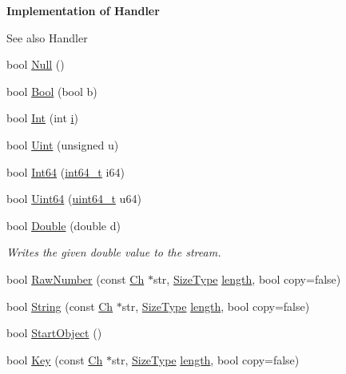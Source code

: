 \begin{Indent}\textbf{ Implementation of Handler}\par
{\em \begin{DoxySeeAlso}{See also}
Handler 
\end{DoxySeeAlso}
}\begin{DoxyCompactItemize}
\item 
bool \hyperlink{classWriter_af700ed03c8810d48a4aaa3c5baeaf26c}{Null} ()
\item 
bool \hyperlink{classWriter_ad7491f4dedb02e7456b240b23ef8c1ad}{Bool} (bool b)
\item 
bool \hyperlink{classWriter_ad471415aa7741e732bab0bcfbb9522a8}{Int} (int \hyperlink{game__play__state_8cpp_acb559820d9ca11295b4500f179ef6392}{i})
\item 
bool \hyperlink{classWriter_a5fb0c3228f89f6f9bef15f3e6e6f1739}{Uint} (unsigned u)
\item 
bool \hyperlink{classWriter_a4144d7086ed9d3d807c373de242bde45}{Int64} (\hyperlink{stdint_8h_a414156feea104f8f75b4ed9e3121b2f6}{int64\+\_\+t} i64)
\item 
bool \hyperlink{classWriter_a55bb9f286ecdaf4cdb07bddb02e0cb2d}{Uint64} (\hyperlink{stdint_8h_aec6fcb673ff035718c238c8c9d544c47}{uint64\+\_\+t} u64)
\item 
bool \hyperlink{classWriter_a22a43e8a7193105deec6b808736f7a1a}{Double} (double d)
\begin{DoxyCompactList}\small\item\em Writes the given {\ttfamily double} value to the stream. \end{DoxyCompactList}\item 
bool \hyperlink{classWriter_ad462dc606fddea0f34fc0e190c3bdaee}{Raw\+Number} (const \hyperlink{classWriter_ab08bff5fd2daec65f4a78779ca3d2139}{Ch} $\ast$str, \hyperlink{rapidjson_8h_a5ed6e6e67250fadbd041127e6386dcb5}{Size\+Type} \hyperlink{imgui__impl__opengl3__loader_8h_a011fc24f10426c01349e94a4edd4b0d5}{length}, bool copy=false)
\item 
bool \hyperlink{classWriter_a8b4dc44f471403a83c9959575796ceab}{String} (const \hyperlink{classWriter_ab08bff5fd2daec65f4a78779ca3d2139}{Ch} $\ast$str, \hyperlink{rapidjson_8h_a5ed6e6e67250fadbd041127e6386dcb5}{Size\+Type} \hyperlink{imgui__impl__opengl3__loader_8h_a011fc24f10426c01349e94a4edd4b0d5}{length}, bool copy=false)
\item 
bool \hyperlink{classWriter_aec3200b2fc80ec87d1c37f775256b2e1}{Start\+Object} ()
\item 
bool \hyperlink{classWriter_a19096d2ccb90761f63ab1240337bf90a}{Key} (const \hyperlink{classWriter_ab08bff5fd2daec65f4a78779ca3d2139}{Ch} $\ast$str, \hyperlink{rapidjson_8h_a5ed6e6e67250fadbd041127e6386dcb5}{Size\+Type} \hyperlink{imgui__impl__opengl3__loader_8h_a011fc24f10426c01349e94a4edd4b0d5}{length}, bool copy=false)

\end{DoxyCompactItemize}
\end{Indent}
